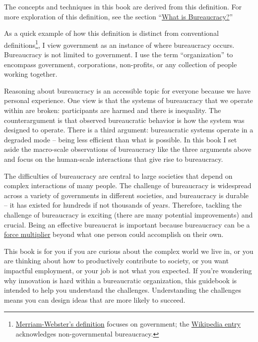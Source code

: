 The concepts and techniques in this book are derived from this definition. For more exploration of this definition, see the section ``\hyperref[sec:define-bureaucracy]{What is Bureaucracy?}''

As a quick example of how this definition is distinct from conventional definitions\footnote{\href{https://www.merriam-webster.com/dictionary/bureaucracy}{Merriam-Webster's definition} focuses on government; the \href{https://www.merriam-webster.com/dictionary/bureaucracy}{Wikipedia entry} acknowledges non-governmental bureaucracy.}, I view government as an instance of where bureaucracy occurs. Bureaucracy is not limited to government. I use the term ``organization'' to encompass government, corporations, non-profits, or any collection of people working together.

Reasoning about bureaucracy is an accessible topic for everyone because we have personal experience.
One view is that the systems of bureaucracy that we operate within are broken: participants are harmed and there is inequality. 
The counterargument is that observed bureaucratic behavior is how the system was designed to operate. There is a third argument: bureaucratic systems operate in a degraded mode -- being less efficient than what is possible. 
In this book I set aside the macro-scale observations of bureaucracy like the three arguments above and focus on the human-scale interactions that give rise to bureaucracy.

The difficulties of bureaucracy are central  to large societies that depend on complex interactions of many people. The challenge of bureaucracy is widespread across a variety of governments in different societies, and bureaucracy is durable -- it has existed for hundreds if not thousands of years. Therefore, tackling the challenge of bureaucracy is exciting (there are many potential improvements) and crucial. 
Being an effective bureaucrat is important because bureaucracy can be a \href{https://en.wikipedia.org/wiki/Force_multiplication}{force multiplier} beyond what one person could accomplish on their own.


This book is for you if you are curious about the complex world we live in, or you are thinking about how to productively contribute to society, or you want impactful employment, or your job is not what you expected. If you're wondering why innovation is hard within a bureaucratic organization, this guidebook is intended to help you understand the challenges. Understanding the challenges means you can design ideas that are more likely to succeed.


